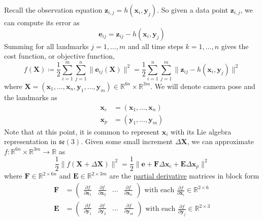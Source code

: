 \documentclass{article}
\begin{document}
  Recall the observation equation $\mathbf{z}_{i, j} = h(\mathbf{x}_i, \mathbf{y}_{j})$. So given a data point $\mathbf{z}_{i, j}$, we can compute its error as 
  \begin{equation}
    \mathbf{e}_{ij} = \mathbf{z}_{ij} - h( \mathbf{x}_i, \mathbf{y}_j)
  \end{equation}
  Summing for all landmarks $j = 1, \ldots, m$ and all time steps $k = 1, \ldots, n$ gives the cost function, or objective function, 
  \begin{equation}
    f(\mathbf{X}) \coloneqq \frac{1}{2} \sum_{i=1}^m \sum_{j=1}^n \| \mathbf{e}_{ij} (\mathbf{X})\|^2 = \frac{1}{2} \sum_{i=1}^n \sum_{j=1}^m \|\mathbf{z}_{ij} - h( \mathbf{x}_i, \mathbf{y}_j)\|^2
  \end{equation}
  where $\mathbf{X} = (\mathbf{x}_1, \ldots, \mathbf{x}_n, \mathbf{y}_1, \ldots, \mathbf{y}_m) \in \mathbb{R}^{6n} \times \mathbb{R}^{3m}$. We will denote camera pose and the landmarks as 
  \begin{align*}
      \mathbf{x}_c & = (\mathbf{x}_1, \ldots, \mathbf{x}_n) \\ 
      \mathbf{x}_p & = (\mathbf{y}_1 , \ldots, \mathbf{y}_m)
  \end{align*}
  Note that at this point, it is common to represent $\mathbf{x}_i$ with its Lie algebra representation in $\mathfrak{se}(3)$. Given some small increment $\Delta \mathbf{X}$, we can approximate $f: \mathbb{R}^{6n} \times \mathbb{R}^{3m} \to \mathbb{R}$ as 
  \begin{equation}
    \frac{1}{2} \| f(\mathbf{X} + \Delta \mathbf{X})\|^2 = \frac{1}{2} \| \mathbf{e} + \mathbf{F} \Delta \mathbf{x}_c + \mathbf{E} \Delta \mathbf{x}_p \|^2
  \end{equation}
  where $\mathbf{F} \in \mathbb{R}^{2 \times 6n}$ and $\mathbf{E} \in \mathbb{R}^{2 \times 3m}$ are the \hyperref[mv-def:partial-derivative]{partial derivative} matrices in block form 
  \begin{align*}
      \mathbf{F} & = \begin{pmatrix} \frac{\partial f}{\partial \mathbf{x}_1} & \frac{\partial f}{\partial \mathbf{x}_2} & \ldots & \frac{\partial f}{\partial \mathbf{x}_n} \end{pmatrix} \text{ with each } \frac{\partial f}{\partial \mathbf{x}_i} \in \mathbb{R}^{2 \times 6}\\
      \mathbf{E} & = \begin{pmatrix} \frac{\partial f}{\partial \mathbf{y}_1} & \frac{\partial f}{\partial \mathbf{y}_2} & \ldots & \frac{\partial f}{\partial \mathbf{y}_m} \end{pmatrix} \text{ with each } \frac{\partial f}{\partial \mathbf{y}_j} \in \mathbb{R}^{2 \times 3} 
  \end{align*}
\end{document}
